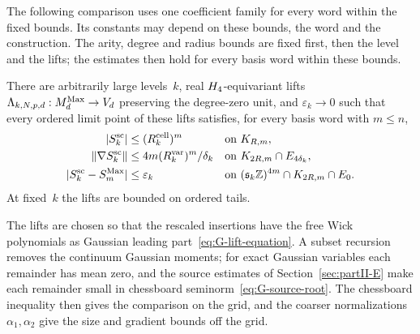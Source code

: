 The following comparison uses one coefficient family for every word within the fixed bounds. Its constants may depend on these bounds, the word and the construction. The arity, degree and radius bounds are fixed first, then the level and the lifts; the estimates then hold for every basis word within these bounds.
\begin{lemma}\label{lem:G-lattice}
There are arbitrarily large levels~$k$, real $H_4$-equivariant lifts $\Lambda_{k,N,p,d}:M_{d}^{\mathrm{Max}}\to V_d$ preserving the degree-zero unit, and $\varepsilon_k\to0$ such that every ordered limit point of these lifts satisfies, for every basis word with $m\le n$,
\begin{equation}\label{eq:G-lattice-input}
\begin{aligned}
|S^{\rm sc}_k|&\le (R^{\rm cell}_k)^m &&\text{on }K_{R,m},\\
\|\nabla S^{\rm sc}_k\|&\le4m (R^{\rm var}_k)^m/\delta_k &&\text{on }K_{2R,m}\cap E_{4\delta_k},\\
|S^{\rm sc}_k-S_m^{\rm Max}|&\le\varepsilon_k
&&\text{on }(\mathfrak s_k\mathbb{Z})^{4m}\cap K_{2R,m}\cap E_0.
\end{aligned}
\end{equation}
At fixed~$k$ the lifts are bounded on ordered tails.
\end{lemma}
The lifts are chosen so that the rescaled insertions have the free Wick polynomials as Gaussian leading part~\eqref{eq:G-lift-equation}. A subset recursion removes the continuum Gaussian moments; for exact Gaussian variables each remainder has mean zero, and the source estimates of Section~\ref{sec:partII-E} make each remainder small in chessboard seminorm~\eqref{eq:G-source-root}. The chessboard inequality then gives the comparison on the grid, and the coarser normalizations $\alpha_1,\alpha_2$ give the size and gradient bounds off the grid.
